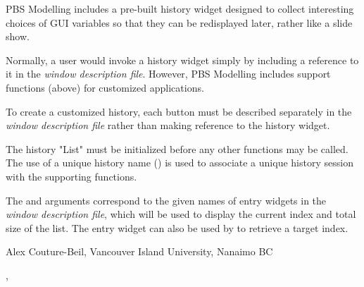 \documentclass[letterpaper]{book}
\begin{document}
\begin{Details}\relax
PBS Modelling includes a pre-built history widget designed to collect interesting choices of
GUI variables so that they can be redisplayed later, rather like a slide show. 

Normally, a user would invoke a history widget simply by including a reference to it 
in the \emph{window description file}. However, PBS Modelling includes support functions (above) 
for customized applications.

To create a customized history, each button must be described separately in the 
\emph{window description file} rather than making reference to the history widget.

The history "List" must be initialized before any other functions may be called. 
The use of a unique history name () is used to associate a unique 
history session with the supporting functions.

The  and  arguments correspond to the given names 
of entry widgets in the \emph{window description file}, which will be used to display the 
current index and total size of the list. The  entry widget can also 
be used by  to retrieve a target index.
\end{Details}
%
\begin{Author}\relax
Alex Couture-Beil, Vancouver Island University, Nanaimo BC
\end{Author}
%
\begin{SeeAlso}\relax
{}, 
\end{SeeAlso}
%
\end{document}
